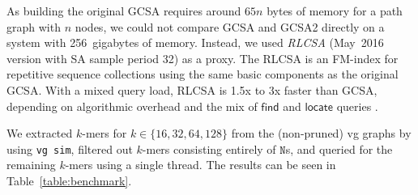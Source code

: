 \documentclass[twoside,leqno,twocolumn]{article}
\newcommand{\set}[1]{\ensuremath{\{ #1 \}}}
\newcommand{\baseN}{\mathtt{N}}
\newcommand{\find}{\ensuremath{\mathsf{find}}}
\newcommand{\locate}{\ensuremath{\mathsf{locate}}}
\newcommand{\kmer}[1]{$#1$\nobreakdash-mer}
\begin{document}
As building the original GCSA requires around $65n$ bytes of memory for a path graph with $n$ nodes, we could not compare GCSA and GCSA2 directly on a system with 256~gigabytes of memory. Instead, we used \emph{RLCSA} \cite{Maekinen2010} (May~2016 version with SA sample period 32) as a proxy. The RLCSA is an FM-index for repetitive sequence collections using the same basic components as the original GCSA. With a mixed query load, RLCSA is 1.5x to 3x faster than GCSA, depending on algorithmic overhead and the mix of $\find$ and $\locate$ queries \cite{Siren2014}.

We extracted \kmer{k}s for $k \in \set{16, 32, 64, 128}$ from the (non-pruned) vg graphs by using \texttt{vg sim}, filtered out \kmer{k}s consisting entirely of $\baseN$s, and queried for the remaining \kmer{k}s using a single thread. The results can be seen in Table~\ref{table:benchmark}.
\end{document}
